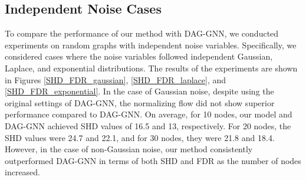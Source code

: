 \documentclass[10pt]{article}
\begin{document}
\subsection{Independent Noise Cases}

To compare the performance of our method with DAG-GNN, we conducted experiments on random graphs with independent noise variables. Specifically, we considered cases where the noise variables followed independent Gaussian, Laplace, and exponential distributions. The results of the experiments are shown in Figures \ref*{SHD_FDR_gaussian}, \ref*{SHD_FDR_laplace}, and \ref*{SHD_FDR_exponential}. In the case of Gaussian noise, despite using the original settings of DAG-GNN, the normalizing flow did not show superior performance compared to DAG-GNN. On average, for 10 nodes, our model and DAG-GNN achieved SHD values of 16.5 and 13, respectively. For 20 nodes, the SHD values were 24.7 and 22.1, and for 30 nodes, they were 21.8 and 18.4. However, in the case of non-Gaussian noise, our method consistently outperformed DAG-GNN in terms of both SHD and FDR as the number of nodes increased.
\end{document}
